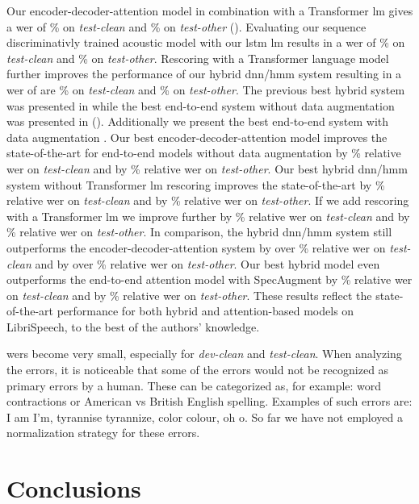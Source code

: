 \documentclass[a4paper]{article}
\begin{document}
Our encoder-decoder-attention model in combination with a Transformer \ac{lm} gives a \ac{wer} of \% on \emph{test-clean} and \% on \emph{test-other} ().
Evaluating our sequence discriminativly trained acoustic model with our \ac{lstm} \ac{lm} results in a \ac{wer} of \% on \emph{test-clean} and \% on \emph{test-other}.
Rescoring with a Transformer language model further improves the performance of our hybrid \ac{dnn}/\ac{hmm} system
resulting in a \ac{wer} of are \% on \emph{test-clean} and \% on \emph{test-other}.
The previous best hybrid system was presented in \cite{han2017:capio} while the best end-to-end system without data augmentation was presented in \cite{zeghidour2018:fully,irie2019} ().
Additionally we present the best end-to-end system with data augmentation \cite{park2019specaugment}.
Our best encoder-decoder-attention model improves the state-of-the-art for end-to-end models without data augmentation by \% relative \ac{wer} on \emph{test-clean} and by \% relative \ac{wer} on \emph{test-other}.
Our best hybrid \ac{dnn}/\ac{hmm} system without Transformer \ac{lm} rescoring improves the state-of-the-art by \% relative \ac{wer} on \emph{test-clean} and by \% relative \ac{wer} on \emph{test-other}.
If we add rescoring with a Transformer \ac{lm} we improve further by \% relative \ac{wer} on \emph{test-clean} and by \% relative \ac{wer} on \emph{test-other}.
In comparison, the hybrid \ac{dnn}/\ac{hmm} system still outperforms the encoder-decoder-attention system by over \% relative \ac{wer} on \emph{test-clean} and by over \% relative \ac{wer} on \emph{test-other}.
Our best hybrid model even outperforms the end-to-end attention model with SpecAugment \cite{park2019specaugment} by \% relative \ac{wer} on \emph{test-clean} and by \% relative \ac{wer} on \emph{test-other}.
These results reflect the state-of-the-art performance for both hybrid and attention-based models on LibriSpeech, to the best of the authors' knowledge.

\acp{wer} become very small, especially for \emph{dev-clean} and \emph{test-clean}.
When analyzing the errors, it is noticeable that some of the errors would not be recognized as primary errors by a human.
These can be categorized as, for example: word contractions or American vs British English spelling.
Examples of such errors are: I am  I'm, tyrannise  tyrannize, color  colour, oh  o.
So far we have not employed a normalization strategy for these errors.


\section{Conclusions}
\end{document}
